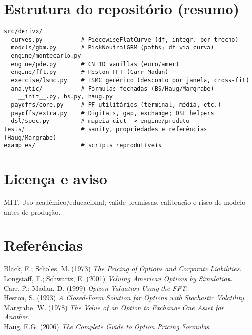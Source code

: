 ﻿\documentclass[11pt,a4paper]{article}
\begin{document}
\section{Estrutura do repositório (resumo)}
\begin{verbatim}
src/derivx/
  curves.py           # PiecewiseFlatCurve (df, integr. por trecho)
  models/gbm.py       # RiskNeutralGBM (paths; df via curva)
  engine/montecarlo.py
  engine/pde.py       # CN 1D vanillas (euro/amer)
  engine/fft.py       # Heston FFT (Carr-Madan)
  exercise/lsmc.py    # LSMC genérico (desconto por janela, cross-fit)
  analytic/           # Fórmulas fechadas (BS/Haug/Margrabe)
    __init__.py, bs.py, haug.py
  payoffs/core.py     # PF utilitários (terminal, média, etc.)
  payoffs/extra.py    # Digitais, gap, exchange; DSL helpers
  dsl/spec.py         # mapeia dict -> engine/produto
tests/                # sanity, propriedades e referências (Haug/Margrabe)
examples/             # scripts reprodutíveis
\end{verbatim}

\section{Licença e aviso}
MIT. Uso acadêmico/educacional; valide premissas, calibração e risco de modelo antes de produção.

\section*{Referências}
\noindent
Black, F.; Scholes, M. (1973) \emph{The Pricing of Options and Corporate Liabilities}.\\
Longstaff, F.; Schwartz, E. (2001) \emph{Valuing American Options by Simulation}.\\
Carr, P.; Madan, D. (1999) \emph{Option Valuation Using the FFT}.\\
Heston, S. (1993) \emph{A Closed-Form Solution for Options with Stochastic Volatility}.\\
Margrabe, W. (1978) \emph{The Value of an Option to Exchange One Asset for Another}.\\
Haug, E.G. (2006) \emph{The Complete Guide to Option Pricing Formulas}.
\end{document}
